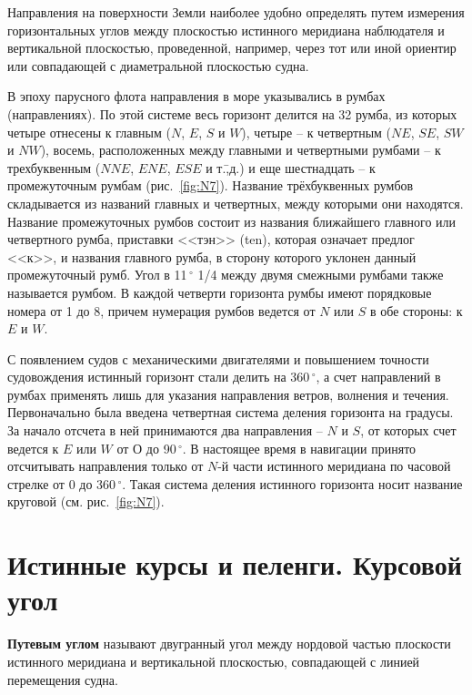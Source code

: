 \documentclass[a4paper, 12pt, twoside, final, book, russian, fittopage, cyremdash]{ncc}
\newcommand{\gr}{\ensuremath{\,^\circ}\xspace}
\newcommand{\ris}[1]{\ref{fig:#1}}
\begin{document}
Направления на поверхности Земли наиболее удобно определять путем измерения горизонтальных углов между плоскостью истинного меридиана наблюдателя и вертикальной плоскостью, проведенной, например, через тот или иной ориентир или совпадающей с диаметральной плоскостью судна. 

В эпоху парусного флота направления в море указывались в румбах (направлениях). По этой системе весь горизонт делится на 32 румба, из которых четыре отнесены к главным ($N$, $E$, $S$ и $W$), четыре \--- к четвертным ($NE$, $SE$, $SW$ и $NW$), восемь, расположенных между главными и четвертными румбами \--- к трехбуквенным ($NNE$, $ENE$, $ESE$ и т.\=,д.) и еще шестнадцать \--- к промежуточным румбам (рис.~\ris{N7}). Название трёхбуквенных румбов складывается из названий главных и четвертных, между которыми они находятся. Название промежуточных румбов состоит из названия ближайшего главного или четвертного румба, приставки <<тэн>> (ten), которая означает предлог <<к>>, и названия главного румба, в сторону которого уклонен данный промежуточный румб. Угол в 11\gr 1/4 между двумя смежными румбами также называется румбом. В каждой четверти горизонта румбы имеют порядковые номера от 1 до 8, причем нумерация румбов ведется от $N$ или $S$ в обе стороны: к $E$ и $W$. 

С появлением судов с механическими двигателями и повышением точности судовождения истинный горизонт стали делить на 360\gr, а счет направлений в румбах применять лишь для указания направления ветров, волнения и течения. Первоначально была введена четвертная система деления горизонта на градусы. За начало отсчета в ней принимаются два направления \--- $N$ и $S$, от которых счет ведется к $E$ или $W$ от О до 90\gr. В настоящее время в навигации принято отсчитывать направления только от $N$-й части истинного меридиана по часовой стрелке от 0 до 360\gr. Такая система деления истинного горизонта носит название круговой (см. рис.~\ris{N7}). 

\section{Истинные курсы и пеленги. Курсовой угол} 

\textbf{Путевым углом} называют двугранный угол между нордовой частью плоскости истинного меридиана и вертикальной плоскостью, совпадающей с линией перемещения судна. 
\end{document}
